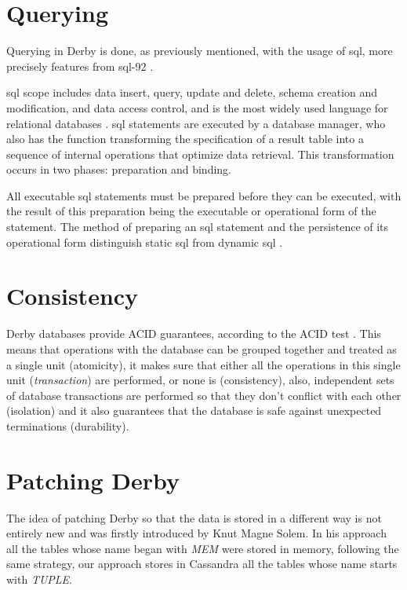 \section{Querying}
Querying in Derby is done, as previously mentioned, with the usage of \ac{sql}, more precisely features from \ac{sql}-92 \cite{derbySQL}.

\ac{sql} scope includes data insert, query, update and delete, schema creation and modification, and data access control, and is the most widely used language for relational databases \cite{SQLintro}. \ac{sql} statements are executed by a database manager, who also has the function transforming the specification of a result table into a sequence of internal operations that optimize data retrieval. This transformation occurs in two phases: preparation and binding.

All executable \ac{sql} statements must be prepared before they can be executed, with the result of this preparation being the executable or operational form of the statement. The method of preparing an \ac{sql} statement and the persistence of its operational form distinguish static \ac{sql} from dynamic \ac{sql} \cite{SQLibm}.

\section{Consistency}
Derby databases provide ACID guarantees, according to the ACID test \cite{derbydevIBM}. This means that operations with the database can be grouped together and treated as a single unit (atomicity), it makes sure that either all the operations in this single unit (\emph{transaction}) are performed, or none is (consistency), also, independent sets of database transactions are performed so that they don't conflict with each other (isolation) and it also guarantees that the database is safe against unexpected terminations (durability).

\section{Patching Derby}

The idea of patching Derby so that the data is stored in a different way is not entirely new and was firstly introduced by Knut Magne Solem\cite{derbyPatch}. In his approach all the tables whose name began with \emph{MEM} were stored in memory, following the same strategy, our approach stores in Cassandra all the tables whose name starts with \emph{TUPLE}.

